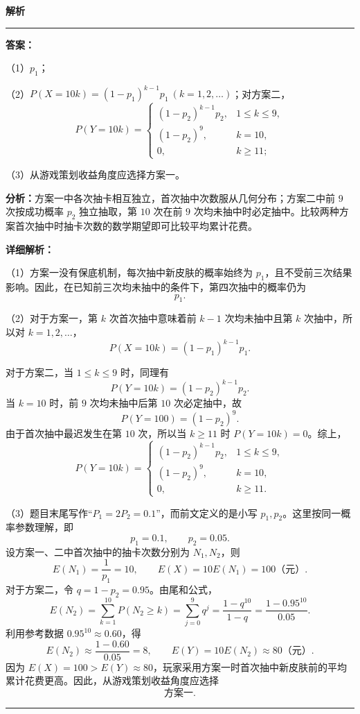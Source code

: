 \documentclass[UTF8,12pt,a4paper]{ctexart}
\newenvironment{examSolutionBox}{%
  \par\medskip\begingroup
  \setlength{\leftskip}{1.0em}\setlength{\rightskip}{0.9em}%
  \noindent\textcolor{SolutionTeal}{\bfseries\large 解析}\par
  \smallskip\noindent\textcolor{SolutionRule}{\rule{\dimexpr\linewidth-\leftskip-\rightskip\relax}{0.8pt}}\par
  \smallskip\color{SolutionInk}%
}{%
  \par\smallskip\noindent\textcolor{SolutionRule}{\rule{\dimexpr\linewidth-\leftskip-\rightskip\relax}{0.8pt}}\par
  \endgroup\medskip
}
\begin{document}
\begin{examSolutionBox}

\textbf{答案：}
\par\smallskip\noindent（1）\(p_1\)；
\par\smallskip\noindent（2）\(P(X=10k)=(1-p_1)^{k-1}p_1\ (k=1,2,\ldots)\)；对方案二，
\[
   P(Y=10k)=
   \begin{cases}
   (1-p_2)^{k-1}p_2,&1\le k\le9,\\
   (1-p_2)^9,&k=10,\\
   0,&k\ge11;
   \end{cases}
   \]

\par\smallskip\noindent（3）从游戏策划收益角度应选择方案一。

\textbf{分析：}方案一中各次抽卡相互独立，首次抽中次数服从几何分布；方案二中前 \(9\) 次按成功概率 \(p_2\) 独立抽取，第 \(10\) 次在前 \(9\) 次均未抽中时必定抽中。比较两种方案首次抽中时抽卡次数的数学期望即可比较平均累计花费。

\textbf{详细解析：}


\par\smallskip\noindent（1）方案一没有保底机制，每次抽中新皮肤的概率始终为 \(p_1\)，且不受前三次结果影响。因此，在已知前三次均未抽中的条件下，第四次抽中的概率仍为
\[
   \boxed{p_1}.
   \]


\par\smallskip\noindent（2）对于方案一，第 \(k\) 次首次抽中意味着前 \(k-1\) 次均未抽中且第 \(k\) 次抽中，所以对 \(k=1,2,\ldots\)，
\[
   \boxed{P(X=10k)=(1-p_1)^{k-1}p_1}.
   \]

对于方案二，当 \(1\le k\le9\) 时，同理有
\[
   P(Y=10k)=(1-p_2)^{k-1}p_2.
   \]
当 \(k=10\) 时，前 \(9\) 次均未抽中后第 \(10\) 次必定抽中，故
\[
   P(Y=100)=(1-p_2)^9.
   \]
由于首次抽中最迟发生在第 \(10\) 次，所以当 \(k\ge11\) 时 \(P(Y=10k)=0\)。综上，
\[
   \boxed{
   P(Y=10k)=
   \begin{cases}
   (1-p_2)^{k-1}p_2,&1\le k\le9,\\
   (1-p_2)^9,&k=10,\\
   0,&k\ge11.
   \end{cases}}
   \]


\par\smallskip\noindent（3）题目末尾写作``\(P_1=2P_2=0.1\)''，而前文定义的是小写 \(p_1,p_2\)。这里按同一概率参数理解，即
\[
   p_1=0.1,\qquad p_2=0.05.
   \]
设方案一、二中首次抽中的抽卡次数分别为 \(N_1,N_2\)，则
\[
   E(N_1)=\frac1{p_1}=10,
   \qquad
   E(X)=10E(N_1)=100\text{（元）}.
   \]
对于方案二，令 \(q=1-p_2=0.95\)。由尾和公式，
\[
   E(N_2)
   =\sum_{k=1}^{10}P(N_2\ge k)
   =\sum_{j=0}^{9}q^j
   =\frac{1-q^{10}}{1-q}
   =\frac{1-0.95^{10}}{0.05}.
   \]
利用参考数据 \(0.95^{10}\approx0.60\)，得
\[
   E(N_2)\approx\frac{1-0.60}{0.05}=8,
   \qquad
   E(Y)=10E(N_2)\approx80\text{（元）}.
   \]
因为 \(E(X)=100>E(Y)\approx80\)，玩家采用方案一时首次抽中新皮肤前的平均累计花费更高。因此，从游戏策划收益角度应选择
\[
   \boxed{\text{方案一}}.
   \]


\end{examSolutionBox}
\end{document}
